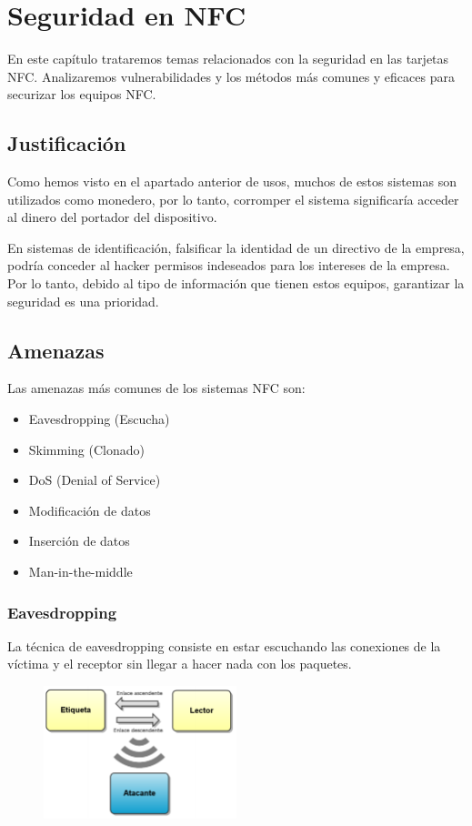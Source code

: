 \chapter{Seguridad en NFC}\label{ch:seguridad}
En este capítulo trataremos temas relacionados con la seguridad en las tarjetas NFC. Analizaremos vulnerabilidades y los métodos más comunes y eficaces para securizar los equipos NFC.
\clearpage
\section{Justificación}
Como hemos visto en el apartado anterior de usos, muchos de estos sistemas son utilizados como monedero, por lo tanto, corromper el sistema significaría acceder al dinero del portador del dispositivo.\par
En sistemas de identificación, falsificar la identidad de un directivo de la empresa, podría conceder al hacker permisos indeseados para los intereses de la empresa. Por lo tanto, debido al tipo de información que tienen estos equipos, garantizar la seguridad es una prioridad.
\section{Amenazas}
Las amenazas más comunes de los sistemas NFC son:
\begin{itemize}
	\item Eavesdropping (Escucha)
	\item Skimming (Clonado)
	\item DoS (Denial of Service)
	\item Modificación de datos
	\item Inserción de datos
	\item Man-in-the-middle
\end{itemize}
\subsection{Eavesdropping}
La técnica de eavesdropping consiste en estar escuchando las conexiones de la víctima y el receptor sin llegar a hacer nada con los paquetes.
\begin{figure}[!h]
	\centering
	\includegraphics[width=0.5\textwidth]{figures/eavesdropping.png}
\end{figure}
